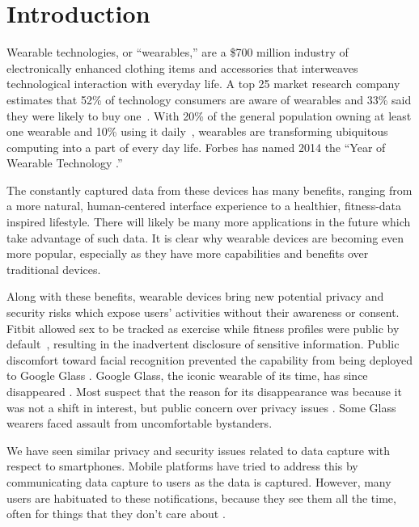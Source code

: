 
\section{Introduction}

Wearable technologies, or ``wearables,'' are a \$700 million industry \cite{cmo} of electronically enhanced clothing items and accessories that interweaves technological interaction with everyday life. A top 25 market research company estimates that 52\% of technology consumers are aware of wearables and 33\% said they were likely to buy one~\cite{NPD}. With 20\% of the general population owning at least one wearable and 10\% using it daily~\cite{WearableStatNews}, wearables are transforming ubiquitous computing into a part of every day life. Forbes has named 2014 the ``Year of Wearable Technology \cite{Forbes}.''

The constantly captured data from these devices has many benefits, ranging from a more natural, human-centered interface experience to a healthier, fitness-data inspired lifestyle. There will likely be many more applications in the future which take advantage of such data. It is clear why wearable devices are becoming even more popular, especially as they have more capabilities and benefits over traditional devices. 

Along with these benefits, wearable devices bring new potential privacy and security risks which expose users' activities without their awareness or consent. Fitbit allowed sex to be tracked as exercise while fitness profiles were public by default~\cite{Fitbit}, resulting in the inadvertent disclosure of sensitive information. Public discomfort toward facial recognition prevented the capability from being deployed to Google Glass \cite{GlassDetection}. Google Glass, the iconic wearable of its time, has since disappeared \cite{13_google_2015}. Most suspect that the reason for its disappearance was because it was not a shift in interest, but public concern over privacy issues \cite{14_dvorak_2014}. Some Glass wearers faced assault \cite{1_russell_2014, 15_mashable_2014, 16_gross_2014} from uncomfortable bystanders.

We have seen similar privacy \cite{kelley2013privacy, sadeh2009understanding, shklovski2014leakiness} and security issues \cite{enck2011study, felt2011survey} related to data capture with respect to smartphones. Mobile platforms have tried to address this by communicating data capture to users as the data is captured. However, many users are habituated to these notifications, because they see them all the time, often for things that they don't care about \cite{felt2012android}.

